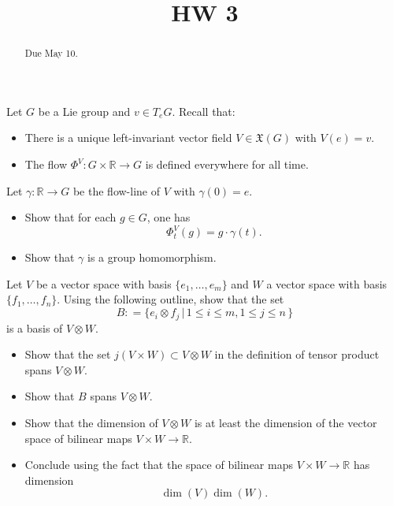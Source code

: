 \documentclass{ximera}
\title{HW 3}
\begin{document}
    \begin{abstract}  Due May 10.  \end{abstract}
    \maketitle


\begin{exercise}
    
     Let $G$ be a Lie group and $v \in T_eG$. Recall that:
    \begin{itemize}
        \item There is a unique left-invariant vector field $V \in \mathfrak{X}(G)$ with $V(e) = v$.
        \item The flow $\Phi^V : G \times \mathbb{R} \to G $ is defined everywhere for all time.
    \end{itemize} 
    Let  $\gamma : \mathbb{R} \to G$ be the flow-line of $V$ with $\gamma (0) = e$.
    \begin{itemize}
        \item Show that for each $g \in G$, one has 
        \[    \Phi_t^V (g) = g \cdot \gamma (t)  .       \]
        \item Show that  $\gamma $ is a group homomorphism.
    \end{itemize}

\end{exercise}
\begin{exercise}
      Let $V$ be a vector space with basis $\{ e_1, \ldots , e_m \}$ and $W$ a vector space with basis $\{ f_1, \ldots , f_n \}$. Using the following outline, show that the set
    \[  B : =  \{ e_i \otimes f_j \, \vert \, 1 \leq i \leq m , 1 \leq j \leq n \, \}                         \]
    is a basis of $V \otimes W$. 
    \begin{itemize}
        \item Show that the set $j (V \times W) \subset V \otimes W$ in the definition of tensor product spans $V \otimes W$. 
        \item Show that $B$ spans $V \otimes W$.
        \item Show that the dimension of $V \otimes W$ is at least the dimension of the vector space of bilinear maps $V \times W \to \mathbb{R}$. 
        \item Conclude using the fact that the space of bilinear maps $V \times W \to \mathbb{R}$ has dimension 
        \[   \dim (V) \dim (W)  .\]
    \end{itemize}

\end{exercise}
   
\end{document}
